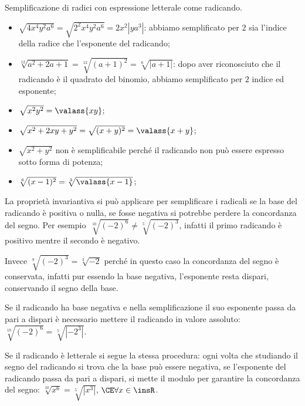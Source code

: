\begin{exrig}
 \begin{esempio}
Semplificazione di radici con espressione letterale come radicando.
\begin{itemize}
\item $\sqrt{4x^4y^2a^6}=\sqrt{2^2x^4y^2a^6}=2x^2\left|ya^3\right|$: abbiamo semplificato per $2$ sia l'indice della radice che l'esponente del radicando;
\item $\sqrt[12]{a^2+2a+1}=\sqrt[12]{(a+1)^2}=\sqrt[6]{\left|a+1\right|}$: dopo aver riconosciuto che il radicando è il quadrato del binomio, abbiamo semplificato per $2$ indice ed esponente;
\item $\sqrt{x^2y^2}=\valass{xy}$;
\item $\sqrt{x^2+2xy+y^2}=\sqrt{(x+y)^2}=\valass{x+y}$;
\item $\sqrt{x^2+y^2}$ non è semplificabile perché il radicando non può essere espresso sotto forma di potenza;
\item $\sqrt[6]{(x-1)^2}=\sqrt[3]{\valass{x-1}}$;
\end{itemize}
 \end{esempio}
\end{exrig}

La proprietà invariantiva si può applicare per semplificare i radicali se la base del radicando è positiva o nulla, se fosse negativa si potrebbe perdere la concordanza del segno. Per esempio~$\sqrt[10]{(-2)^6}\neq \sqrt[5]{(-2)^3}$, infatti il primo radicando è positivo mentre il secondo è negativo.

Invece $\sqrt[9]{(-2)^3}=\sqrt[3]{-2}$ perché in questo caso la concordanza del segno è conservata, infatti pur essendo la base negativa, l’esponente resta dispari, conservando il segno della base.

Se il radicando ha base negativa e nella semplificazione il suo esponente passa da pari a dispari è necessario mettere il radicando in valore assoluto: $\sqrt[10]{(-2)^6}=\sqrt[5]{\left|-2^3\right|}$.

Se il radicando è letterale si segue la stessa procedura: ogni volta che studiando il segno del radicando si trova che la base può essere negativa, se l’esponente del radicando passa da pari a dispari, si mette il modulo per garantire la concordanza del segno:
$\sqrt[10]{x^6}=\sqrt[5]{\left|x^3\right|}$, $\CE \forall x \in \insR$.

\vspazio\ovalbox{\risolvii \ref{ese:2.21}, \ref{ese:2.22}, \ref{ese:2.23}, \ref{ese:2.24},\ref{ese:2.25},\ref{ese:2.26},\ref{ese:2.27},\ref{ese:2.28},\ref{ese:2.29},\ref{ese:2.30},\ref{ese:2.31}}

